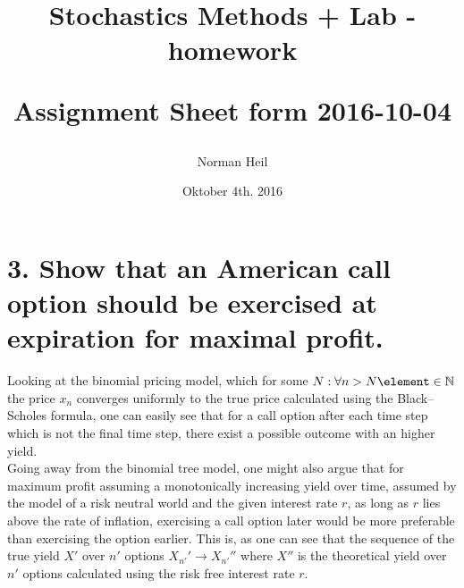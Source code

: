 \documentclass{article}
\title{Stochastics Methods + Lab - homework\\[0.5cm]
\author{Norman Heil}
\large Assignment Sheet form 2016-10-04}
\date{Oktober 4th. 2016}
\begin{document}
\section*{3. Show that an American call option should be exercised at expiration for maximal profit.}
Looking at the binomial pricing model, which for some $N:\forall n>N\element \in \mathbb{N}$ the price $x_n$ converges uniformly to the true price calculated using the Black–Scholes formula, one can easily see that for a call option after each time step which is not the final time step, there exist a possible outcome with an higher yield.\\

Going away from the binomial tree model, one might also argue that for maximum profit assuming a monotonically increasing yield over time, assumed by the model of a risk neutral world and the given interest rate $r$, as long as $r$ lies above the rate of inflation, exercising a call option later would be more preferable than exercising the option earlier. This is, as one can see that the sequence of the true yield $X'$ over $n'$ options $X_{n'}' \longrightarrow X_{n'}''$ where $X''$ is the theoretical yield over $n'$ options calculated using the risk free interest rate $r$.
\end{document}

